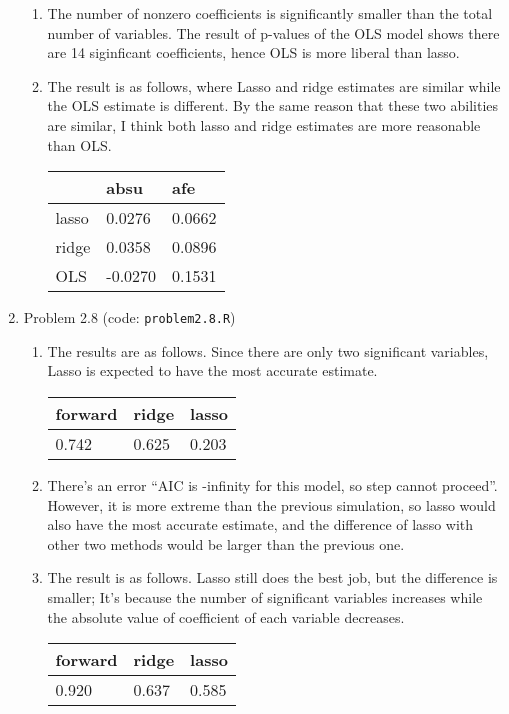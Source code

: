 \documentclass{article}
\begin{document}
\begin{enumerate}
\begin{enumerate}
\item The number of nonzero coefficients is significantly smaller than the total number of variables. The result of p-values of the OLS model shows there are 14 siginficant coefficients, hence OLS is more liberal than lasso.

\item The result is as follows, where Lasso and ridge estimates are similar while the OLS estimate is different. By the same reason that these two abilities are similar, I think both lasso and ridge estimates are more reasonable than OLS.
\begin{table}[h]
\centering
\begin{tabular}{|l|l|l|}
\hline
      & absu    & afe    \\ \hline
lasso & 0.0276  & 0.0662 \\ \hline
ridge & 0.0358  & 0.0896 \\ \hline
OLS   & -0.0270 & 0.1531 \\ \hline
\end{tabular}
\end{table}

\end{enumerate}

\item Problem 2.8 (code: \texttt{problem2.8.R})

\begin{enumerate}

\item The results are as follows. Since there are only two significant variables, Lasso is expected to have the most accurate estimate.
\begin{table}[h]
\centering
\begin{tabular}{|l|l|l|}
\hline
forward & ridge & lasso \\ \hline
0.742   & 0.625 & 0.203 \\ \hline
\end{tabular}
\end{table}

\item There's an error ``AIC is -infinity for this model, so step cannot proceed''. However, it is more extreme than the previous simulation, so lasso would also have the most accurate estimate, and the difference of lasso with other two methods would be larger than the previous one.

\item The result is as follows. Lasso still does the best job, but the difference is smaller; It's because the number of significant variables increases while the absolute value of coefficient of each variable decreases.
\begin{table}[h]
\centering
\begin{tabular}{|l|l|l|}
\hline
forward & ridge & lasso \\ \hline
0.920   & 0.637 & 0.585 \\ \hline
\end{tabular}
\end{table}


\end{enumerate}
\end{enumerate}
\end{document}
